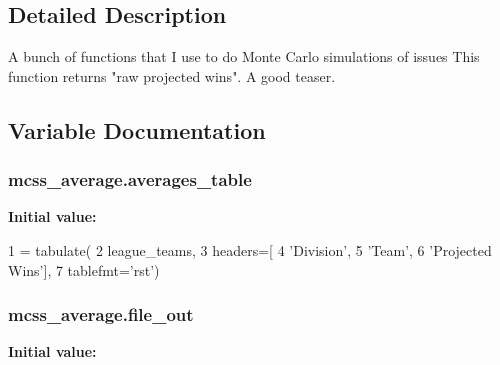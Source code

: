 \subsection{Detailed Description}
\begin{DoxyVerb}A bunch of functions that I use to do Monte Carlo simulations of issues
This function returns "raw projected wins". A good teaser.
\end{DoxyVerb}
 

\subsection{Variable Documentation}
\subsubsection[{\texorpdfstring{averages\+\_\+table}{averages_table}}]{\setlength{\rightskip}{0pt plus 5cm}mcss\+\_\+average.\+averages\+\_\+table}\hypertarget{namespacemcss__average_ad2959c222235027543432c97be938654}{}\label{namespacemcss__average_ad2959c222235027543432c97be938654}
{\bfseries Initial value\+:}
\begin{DoxyCode}
1 = tabulate(
2     league\_teams,
3     headers=[
4         \textcolor{stringliteral}{'Division'},
5         \textcolor{stringliteral}{'Team'},
6         \textcolor{stringliteral}{'Projected Wins'}],
7     tablefmt=\textcolor{stringliteral}{'rst'})
\end{DoxyCode}
\subsubsection[{\texorpdfstring{file\+\_\+out}{file_out}}]{\setlength{\rightskip}{0pt plus 5cm}mcss\+\_\+average.\+file\+\_\+out}\hypertarget{namespacemcss__average_af970b09eef3f66efa462ad2bf266a9a0}{}\label{namespacemcss__average_af970b09eef3f66efa462ad2bf266a9a0}
{\bfseries Initial value\+:}


